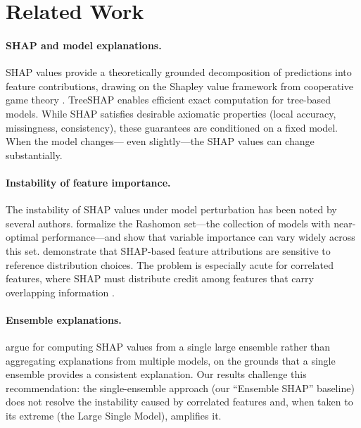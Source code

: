 \documentclass[11pt]{article}
\begin{document}
\section{Related Work}
\label{sec:related}

\paragraph{SHAP and model explanations.}
SHAP values \citep{lundberg2017unified} provide a theoretically grounded
decomposition of predictions into feature contributions, drawing on the
Shapley value framework from cooperative game theory
\citep{shapley1953value}. TreeSHAP \citep{lundberg2020local} enables
efficient exact computation for tree-based models. While SHAP satisfies
desirable axiomatic properties (local accuracy, missingness, consistency),
these guarantees are conditioned on a fixed model. When the model changes---
even slightly---the SHAP values can change substantially.

\paragraph{Instability of feature importance.}
The instability of SHAP values under model perturbation has been noted by
several authors. \citet{fisher2019all} formalize the Rashomon set---the
collection of models with near-optimal performance---and show that
variable importance can vary widely across this set.
\citet{marx2023but} demonstrate that SHAP-based feature attributions
are sensitive to reference distribution choices.
The problem is especially acute for correlated features, where SHAP must
distribute credit among features that carry overlapping information
\citep{kumar2020problems, chen2020true}.

\paragraph{Ensemble explanations.}
\citet{paillard2025ensemble} argue for computing SHAP values from a single
large ensemble rather than aggregating explanations from multiple models,
on the grounds that a single ensemble provides a consistent explanation.
Our results challenge this recommendation: the single-ensemble approach
(our ``Ensemble SHAP'' baseline) does not resolve the instability caused
by correlated features and, when taken to its extreme (the Large Single
Model), amplifies it.
\end{document}
